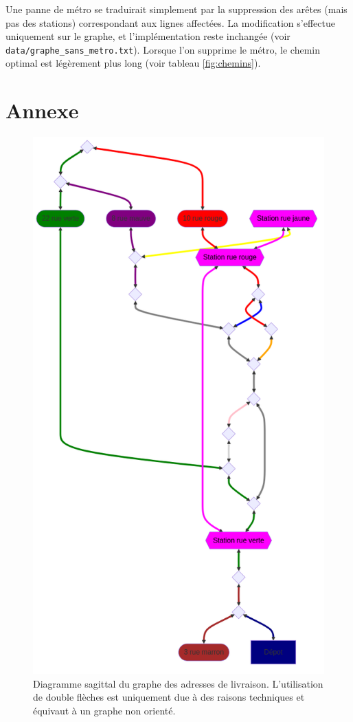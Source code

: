 \documentclass{article}
\begin{document}
Une panne de métro se traduirait simplement par la suppression des arêtes (mais pas des stations) correspondant aux lignes affectées.
La modification s'effectue uniquement sur le graphe, et l'implémentation reste inchangée (voir \texttt{data/graphe\_sans\_metro.txt}).
Lorsque l'on supprime le métro, le chemin optimal est légèrement plus long (voir tableau \ref{fig:chemins}).

\clearpage

\section{Annexe}

\begin{figure}[ht]
    \centering
    \includegraphics[height=0.7\textheight]{Images/Graph.png}
    \caption{Diagramme sagittal du graphe des adresses de livraison.
    L'utilisation de double flèches est uniquement due à des raisons techniques et équivaut à un graphe non orienté.}
    \label{fig:graphe}
\end{figure}
\end{document}
